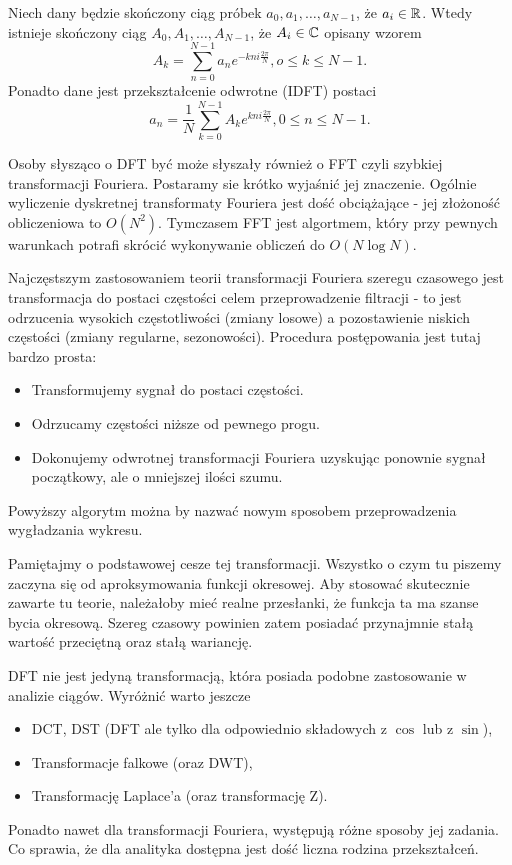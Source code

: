 \documentclass[10pt,a4paper]{book}
\begin{document}
\begin{definition}[DFT]
Niech dany będzie skończony ciąg próbek $a_0, a_1, \ldots, a_{N-1}$, że $a_i \in \mathbb{R} $. Wtedy istnieje skończony ciąg $A_0, A_1, \ldots, A_{N-1}$, że $A_i \in \mathbb{C} $ opisany wzorem
$$
A_k = \sum_{n=0}^{N-1} a_n e^{-kn i \frac{2\pi}{N}}, o \leq k \leq N-1.
$$
Ponadto dane jest przekształcenie odwrotne (IDFT) postaci
$$
a_n = \frac{1}{N} \sum_{k=0}^{N-1} A_k e^{kn i \frac{2\pi}{N}}, 0 \leq n \leq N-1.
$$
\end{definition}

Osoby słysząco o DFT być może słyszały również o FFT czyli szybkiej transformacji Fouriera. Postaramy sie krótko wyjaśnić jej znaczenie. Ogólnie wyliczenie dyskretnej transformaty Fouriera jest dość obciążające - jej złożoność obliczeniowa to $O(N^2)$. Tymczasem FFT jest algortmem, który przy pewnych warunkach potrafi skrócić wykonywanie obliczeń do $O(N \log N)$.

Najczęstszym zastosowaniem teorii transformacji Fouriera szeregu czasowego jest transformacja do postaci częstości celem przeprowadzenie filtracji - to jest odrzucenia wysokich częstotliwości (zmiany losowe) a pozostawienie niskich częstości (zmiany regularne, sezonowości). Procedura postępowania jest tutaj bardzo prosta:

\begin{itemize}
\item Transformujemy sygnał do postaci częstości.
\item Odrzucamy częstości niższe od pewnego progu.
\item Dokonujemy odwrotnej transformacji Fouriera uzyskując ponownie sygnał początkowy, ale o mniejszej ilości szumu.
\end{itemize}

Powyższy algorytm można by nazwać nowym sposobem przeprowadzenia wygładzania wykresu.

\begin{remark*}
Pamiętajmy o podstawowej cesze tej transformacji. Wszystko o czym tu piszemy zaczyna się od aproksymowania funkcji okresowej. Aby stosować skutecznie zawarte tu teorie, należałoby mieć realne przesłanki, że funkcja ta ma szanse bycia okresową. Szereg czasowy powinien zatem posiadać przynajmnie stałą wartość przeciętną oraz stałą wariancję.
\end{remark*} 

\begin{remark*}
DFT nie jest jedyną transformacją, która posiada podobne zastosowanie w analizie ciągów. Wyróżnić warto jeszcze
\begin{itemize}
\item DCT, DST (DFT ale tylko dla odpowiednio składowych z $\cos$ lub z $\sin$),
\item Transformacje falkowe (oraz DWT),
\item Transformację Laplace'a (oraz transformację Z).
\end{itemize}
Ponadto nawet dla transformacji Fouriera, występują różne sposoby jej zadania. Co sprawia, że dla analityka dostępna jest dość liczna rodzina przekształceń.
\end{remark*}
\end{document}
